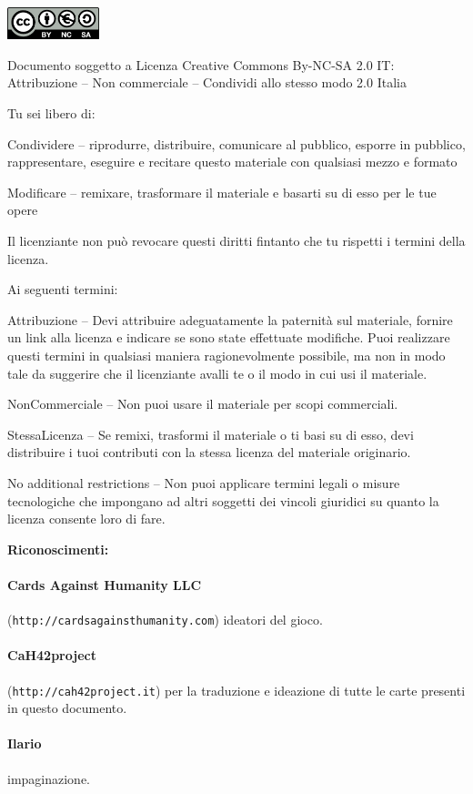 \documentclass[a4paper,12pt]{article}
\begin{document}
\pagebreak

\restoregeometry
\begin{center}
\includegraphics[width=0.2\textwidth]{cc-by-nc-sa.pdf}
\end{center}

\medskip
\noindent
Documento soggetto a Licenza Creative Commons By-NC-SA 2.0 IT: \\ 
\indent
Attribuzione -- Non commerciale -- Condividi allo stesso modo 2.0 Italia

\bigskip

\noindent
Tu sei libero di:

    Condividere -- riprodurre, distribuire, comunicare al pubblico, esporre in pubblico, rappresentare, eseguire e recitare questo materiale con qualsiasi mezzo e formato
\indent

    Modificare -- remixare, trasformare il materiale e basarti su di esso per le tue opere
\indent

    Il licenziante non può revocare questi diritti fintanto che tu rispetti i termini della licenza.
\medskip

\noindent
Ai seguenti termini:

    Attribuzione -- Devi attribuire adeguatamente la paternità sul materiale, fornire un link alla licenza e indicare se sono state effettuate modifiche. Puoi realizzare questi termini in qualsiasi maniera ragionevolmente possibile, ma non in modo tale da suggerire che il licenziante avalli te o il modo in cui usi il materiale.
\indent

    NonCommerciale -- Non puoi usare il materiale per scopi commerciali.
\indent

    StessaLicenza -- Se remixi, trasformi il materiale o ti basi su di esso, devi distribuire i tuoi contributi con la stessa licenza del materiale originario.
\indent

    No additional restrictions -- Non puoi applicare termini legali o misure tecnologiche che impongano ad altri soggetti dei vincoli giuridici su quanto la licenza consente loro di fare.

\bigskip\bigskip

\begin{center}\bf{Riconoscimenti:}\end{center}

\paragraph{Cards Against Humanity LLC} (\texttt{http://cardsagainsthumanity.com}) ideatori del gioco.

\paragraph{CaH42project} (\texttt{http://cah42project.it}) per la traduzione e ideazione di tutte le carte presenti in questo documento.

\paragraph{Ilario} impaginazione.
\end{document}
